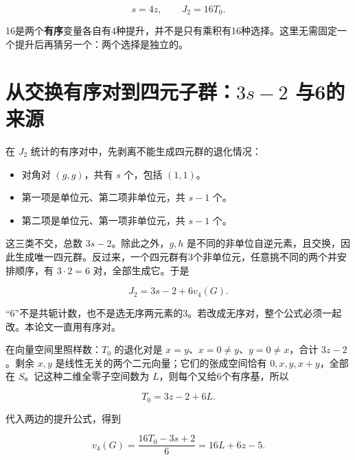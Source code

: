 \documentclass[UTF8,fontset=fandol,zihao=-4,openany,oneside]{ctexbook}
\begin{document}
\[
s=4z,\qquad J_2=16T_0.
\]



16是两个\textbf{有序}变量各自有4种提升，并不是只有乘积有16种选择。这里无需固定一个提升后再猜另一个：两个选择是独立的。



\section{从交换有序对到四元子群：\texorpdfstring{\(3s-2\)}{3s-2} 与6的来源}


在 \(J_2\) 统计的有序对中，先剥离不能生成四元群的退化情况：



\begin{itemize}


\item 对角对 \((g,g)\)，共有 \(s\) 个，包括 \((1,1)\)。

\item 第一项是单位元、第二项非单位元，共 \(s-1\) 个。

\item 第二项是单位元、第一项非单位元，共 \(s-1\) 个。

\end{itemize}


这三类不交，总数 \(3s-2\)。除此之外，\(g,h\) 是不同的非单位自逆元素，且交换，因此生成唯一四元群。反过来，一个四元群有3个非单位元，任意挑不同的两个并安排顺序，有 \(3\cdot2=6\) 对，全部生成它。于是



\[
J_2=3s-2+6v_4(G).\tag{英文(2.2)的一部分}
\]



“6”不是共轭计数，也不是选无序两元素的3。若改成无序对，整个公式必须一起改。本论文一直用有序对。



在向量空间里照样数：\(T_0\) 的退化对是 \(x=y\)、\(x=0\ne y\)、\(y=0\ne x\)，合计 \(3z-2\)。剩余 \(x,y\) 是线性无关的两个二元向量；它们的张成空间恰有 \(0,x,y,x+y\)，全部在 \(S\)。记这种二维全零子空间数为 \(L\)，则每个又给6个有序基，所以



\[
T_0=3z-2+6L.
\]



代入两边的提升公式，得到



\[
v_4(G)=\frac{16T_0-3s+2}{6}=16L+6z-5.
\tag{英文(2.3)}
\]
\end{document}
